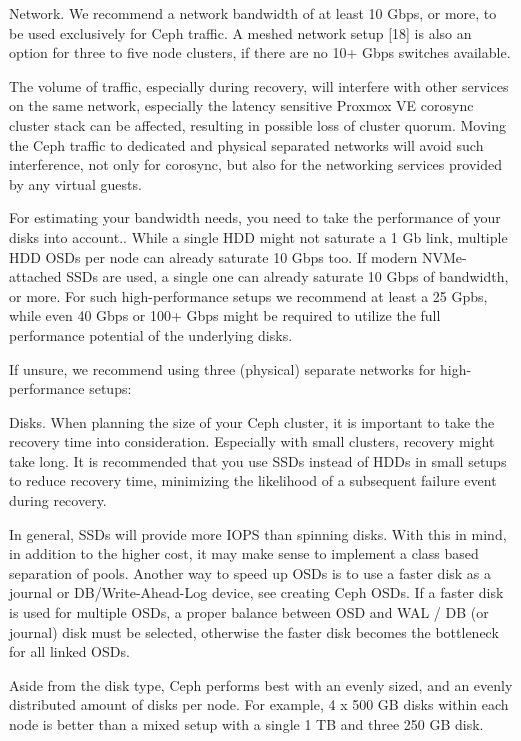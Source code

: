 Network. We recommend a network bandwidth of at least 10 Gbps, or more, to be used exclusively for Ceph traffic. A meshed network setup [18] is also an option for three to five node clusters, if there are no 10+ Gbps switches available.

The volume of traffic, especially during recovery, will interfere with other services on the same network, especially the latency sensitive Proxmox VE corosync cluster stack can be affected, resulting in possible loss of cluster quorum. Moving the Ceph traffic to dedicated and physical separated networks will avoid such interference, not only for corosync, but also for the networking services provided by any virtual guests.

For estimating your bandwidth needs, you need to take the performance of your disks into account.. While a single HDD might not saturate a 1 Gb link, multiple HDD OSDs per node can already saturate 10 Gbps too. If modern NVMe-attached SSDs are used, a single one can already saturate 10 Gbps of bandwidth, or more. For such high-performance setups we recommend at least a 25 Gpbs, while even 40 Gbps or 100+ Gbps might be required to utilize the full performance potential of the underlying disks.

If unsure, we recommend using three (physical) separate networks for high-performance setups:

Disks. When planning the size of your Ceph cluster, it is important to take the recovery time into consideration. Especially with small clusters, recovery might take long. It is recommended that you use SSDs instead of HDDs in small setups to reduce recovery time, minimizing the likelihood of a subsequent failure event during recovery.

In general, SSDs will provide more IOPS than spinning disks. With this in mind, in addition to the higher cost, it may make sense to implement a class based separation of pools. Another way to speed up OSDs is to use a faster disk as a journal or DB/Write-Ahead-Log device, see creating Ceph OSDs. If a faster disk is used for multiple OSDs, a proper balance between OSD and WAL / DB (or journal) disk must be selected, otherwise the faster disk becomes the bottleneck for all linked OSDs.

Aside from the disk type, Ceph performs best with an evenly sized, and an evenly distributed amount of disks per node. For example, 4 x 500 GB disks within each node is better than a mixed setup with a single 1 TB and three 250 GB disk.

